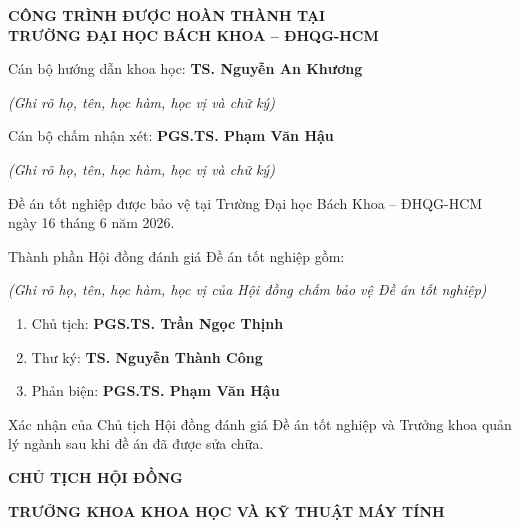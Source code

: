 \cleardoublepage
\thispagestyle{empty}

\begin{center}
    \textbf{CÔNG TRÌNH ĐƯỢC HOÀN THÀNH TẠI}\\
    \textbf{TRƯỜNG ĐẠI HỌC BÁCH KHOA -- ĐHQG-HCM}
\end{center}

\vspace{1.5cm}
\noindent Cán bộ hướng dẫn khoa học: \textbf{TS. Nguyễn An Khương}

\vspace{0.2cm}
\noindent\textit{(Ghi rõ họ, tên, học hàm, học vị và chữ ký)}

\vspace{1cm}
\noindent Cán bộ chấm nhận xét: \textbf{PGS.TS. Phạm Văn Hậu}

\vspace{0.2cm}
\noindent\textit{(Ghi rõ họ, tên, học hàm, học vị và chữ ký)}

\vspace{1cm}
\noindent Đề án tốt nghiệp được bảo vệ tại Trường Đại học Bách Khoa -- ĐHQG-HCM ngày 16 tháng 6 năm 2026.

\vspace{0.7cm}
\noindent Thành phần Hội đồng đánh giá Đề án tốt nghiệp gồm:

\vspace{0.2cm}
\noindent\textit{(Ghi rõ họ, tên, học hàm, học vị của Hội đồng chấm bảo vệ Đề án tốt nghiệp)}

\vspace{0.3cm}
\begin{enumerate}
    \item Chủ tịch: \textbf{PGS.TS. Trần Ngọc Thịnh}
    \item Thư ký: \textbf{TS. Nguyễn Thành Công}
    \item Phản biện: \textbf{PGS.TS. Phạm Văn Hậu}
\end{enumerate}

\vspace{1cm}
\noindent Xác nhận của Chủ tịch Hội đồng đánh giá Đề án tốt nghiệp và Trưởng khoa quản lý ngành sau khi đề án đã được sửa chữa.

\vspace{1cm}
\noindent
\begin{minipage}{0.48\textwidth}
    \centering
    \textbf{CHỦ TỊCH HỘI ĐỒNG}
\end{minipage}
\hfill
\begin{minipage}{0.48\textwidth}
    \centering
    \textbf{TRƯỞNG KHOA KHOA HỌC VÀ KỸ THUẬT MÁY TÍNH}
\end{minipage}

\clearpage

